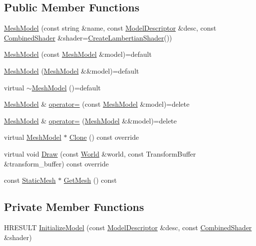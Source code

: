 \subsection*{Public Member Functions}
\begin{DoxyCompactItemize}
\item 
\hyperlink{classmage_1_1_mesh_model_ab340d6b0791d737e6f632422390f0ae1}{Mesh\+Model} (const string \&name, const \hyperlink{classmage_1_1_model_descriptor}{Model\+Descriptor} \&desc, const \hyperlink{structmage_1_1_combined_shader}{Combined\+Shader} \&shader=\hyperlink{namespacemage_ab0bd21012fa29244f0f9b3201bebc2a5}{Create\+Lambertian\+Shader}())
\item 
\hyperlink{classmage_1_1_mesh_model_a60bdd36ff7a0713f82b60287d9a8568c}{Mesh\+Model} (const \hyperlink{classmage_1_1_mesh_model}{Mesh\+Model} \&model)=default
\item 
\hyperlink{classmage_1_1_mesh_model_af7e00b17aa7c20bd575cf276c3d1e32e}{Mesh\+Model} (\hyperlink{classmage_1_1_mesh_model}{Mesh\+Model} \&\&model)=default
\item 
virtual \hyperlink{classmage_1_1_mesh_model_a5e918737b966842a31381ef6c00ca6d2}{$\sim$\+Mesh\+Model} ()=default
\item 
\hyperlink{classmage_1_1_mesh_model}{Mesh\+Model} \& \hyperlink{classmage_1_1_mesh_model_a0cffe92f76d2470c67ae71a5a4046259}{operator=} (const \hyperlink{classmage_1_1_mesh_model}{Mesh\+Model} \&model)=delete
\item 
\hyperlink{classmage_1_1_mesh_model}{Mesh\+Model} \& \hyperlink{classmage_1_1_mesh_model_ab01cee26691745ec7cd1af933bb5fa99}{operator=} (\hyperlink{classmage_1_1_mesh_model}{Mesh\+Model} \&\&model)=delete
\item 
virtual \hyperlink{classmage_1_1_mesh_model}{Mesh\+Model} $\ast$ \hyperlink{classmage_1_1_mesh_model_a7130eca9a1dac038c33b838c15138161}{Clone} () const override
\item 
virtual void \hyperlink{classmage_1_1_mesh_model_a80ef930e0ce901293106ce4ea1336e26}{Draw} (const \hyperlink{classmage_1_1_world}{World} \&world, const Transform\+Buffer \&transform\+\_\+buffer) const override
\item 
const \hyperlink{classmage_1_1_static_mesh}{Static\+Mesh} $\ast$ \hyperlink{classmage_1_1_mesh_model_a16adbbbab2041bfe0b15d3fb108d57cf}{Get\+Mesh} () const
\end{DoxyCompactItemize}
\subsection*{Private Member Functions}
\begin{DoxyCompactItemize}
\item 
H\+R\+E\+S\+U\+LT \hyperlink{classmage_1_1_mesh_model_a9971552f5c866b8ed221df056c46a42d}{Initialize\+Model} (const \hyperlink{classmage_1_1_model_descriptor}{Model\+Descriptor} \&desc, const \hyperlink{structmage_1_1_combined_shader}{Combined\+Shader} \&shader)
\end{DoxyCompactItemize}
